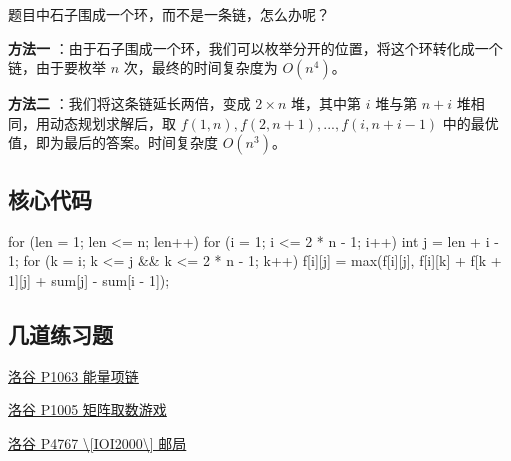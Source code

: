 题目中石子围成一个环，而不是一条链，怎么办呢？

\textbf{ 方法一 } ：由于石子围成一个环，我们可以枚举分开的位置，将这个环转化成一个链，由于要枚举 $n$ 次，最终的时间复杂度为 $O(n^4)$。

\textbf{ 方法二 } ：我们将这条链延长两倍，变成 $2\times n$ 堆，其中第 $i$ 堆与第 $n+i$ 堆相同，用动态规划求解后，取 $f(1,n),f(2,n+1),...,f(i,n+i-1)$ 中的最优值，即为最后的答案。时间复杂度 $O(n^3)$。

\subsection{核心代码}

\begin{cppcode}
for (len = 1; len <= n; len++)
  for (i = 1; i <= 2 * n - 1; i++) {
    int j = len + i - 1;
    for (k = i; k <= j && k <= 2 * n - 1; k++)
      f[i][j] = max(f[i][j], f[i][k] + f[k + 1][j] + sum[j] - sum[i - 1]);
  }
\end{cppcode}

\subsection{几道练习题}

\href{https://www.luogu.org/problemnew/show/P1063}{洛谷 P1063 能量项链}

\href{https://www.luogu.org/problemnew/show/P1005}{洛谷 P1005 矩阵取数游戏}

\href{https://www.luogu.org/problemnew/show/P4767}{洛谷 P4767 \textbackslash{}[IOI2000\textbackslash{}] 邮局}
